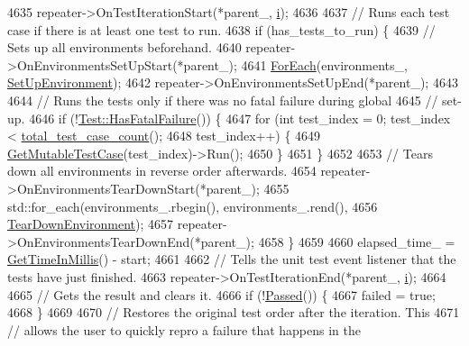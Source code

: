 \begin{DoxyCode}
{4635     repeater->OnTestIterationStart(*parent\_, \hyperlink{gtest__output__test__golden__lin_8txt_a7e98b8a17c0aad30ba64d47b74e2a6c1}{i});
4636 
4637     \textcolor{comment}{// Runs each test case if there is at least one test to run.}
4638     \textcolor{keywordflow}{if} (has\_tests\_to\_run) \{
4639       \textcolor{comment}{// Sets up all environments beforehand.}
4640       repeater->OnEnvironmentsSetUpStart(*parent\_);
4641       \hyperlink{namespacetesting_1_1internal_a52f5504ed65d116201ccb8f99a44fd7e}{ForEach}(environments\_, \hyperlink{namespacetesting_1_1internal_a5f5535012d4548788a5d1a4e0f18e19e}{SetUpEnvironment});
4642       repeater->OnEnvironmentsSetUpEnd(*parent\_);
4643 
4644       \textcolor{comment}{// Runs the tests only if there was no fatal failure during global}
4645       \textcolor{comment}{// set-up.}
4646       \textcolor{keywordflow}{if} (!\hyperlink{classtesting_1_1Test_a5e83604628ef542af888d631566ff60c}{Test::HasFatalFailure}()) \{
4647         \textcolor{keywordflow}{for} (\textcolor{keywordtype}{int} test\_index = 0; test\_index < \hyperlink{classtesting_1_1internal_1_1UnitTestImpl_ab5049f53312560726fa7f05924bfdade}{total\_test\_case\_count}();
4648              test\_index++) \{
4649           \hyperlink{classtesting_1_1internal_1_1UnitTestImpl_a2ca71a08060037357fc7e1a406b89add}{GetMutableTestCase}(test\_index)->Run();
4650         \}
4651       \}
4652 
4653       \textcolor{comment}{// Tears down all environments in reverse order afterwards.}
4654       repeater->OnEnvironmentsTearDownStart(*parent\_);
4655       std::for\_each(environments\_.rbegin(), environments\_.rend(),
4656                     \hyperlink{namespacetesting_1_1internal_ac467e871e4781da3f5ebed2a4465aec4}{TearDownEnvironment});
4657       repeater->OnEnvironmentsTearDownEnd(*parent\_);
4658     \}
4659 
4660     elapsed\_time\_ = \hyperlink{namespacetesting_1_1internal_ae66b46943a429e6efb1db456d4cae90c}{GetTimeInMillis}() - start;
4661 
4662     \textcolor{comment}{// Tells the unit test event listener that the tests have just finished.}
4663     repeater->OnTestIterationEnd(*parent\_, \hyperlink{gtest__output__test__golden__lin_8txt_a7e98b8a17c0aad30ba64d47b74e2a6c1}{i});
4664 
4665     \textcolor{comment}{// Gets the result and clears it.}
4666     \textcolor{keywordflow}{if} (!\hyperlink{classtesting_1_1internal_1_1UnitTestImpl_aca57d4b475d7b9ad49f061197124c183}{Passed}()) \{
4667       failed = \textcolor{keyword}{true};
4668     \}
4669 
4670     \textcolor{comment}{// Restores the original test order after the iteration.  This}
4671     \textcolor{comment}{// allows the user to quickly repro a failure that happens in the}
}
\end{DoxyCode}
